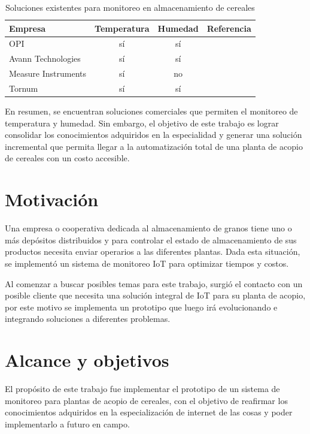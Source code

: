\begin{table}[h]
	\centering
	\caption[]{Soluciones existentes para monitoreo en almacenamiento de cereales}
	\begin{tabular}{l c c c}    
		\toprule
		\textbf{Empresa} 	 & \textbf{Temperatura} 		& \textbf{Humedad} & \textbf{Referencia} \\
		\midrule
		  OPI & sí	& sí  & \citep{WEBSITE:4}\\		
		Avann Technologies	 & sí	& sí & \citep{WEBSITE:3}\\
		Measure Instruments	 & sí	& no & \citep{WEBSITE:1} \\
            Tornum	 & sí	& sí  & \citep{WEBSITE:2}\\
		\bottomrule
		\hline
	\end{tabular}
	\label{tab:peces}
\end{table}

En resumen, se encuentran soluciones comerciales que permiten el monitoreo de temperatura y humedad. Sin embargo, el objetivo de este trabajo es lograr consolidar los conocimientos adquiridos en la especialidad y generar una solución incremental que permita llegar a la automatización total de una planta de acopio de cereales con un costo accesible. 

\section{Motivación}
Una empresa o cooperativa dedicada al almacenamiento de granos tiene uno o más depósitos distribuidos y para controlar el estado de almacenamiento de sus productos necesita enviar operarios a las diferentes plantas. Dada esta situación, se implementó un sistema de monitoreo IoT para optimizar tiempos y costos.

Al comenzar a buscar posibles temas para este trabajo, surgió el contacto con un posible cliente que necesita una solución integral de IoT para su planta de acopio, por este motivo se implementa un prototipo que luego irá evolucionando e integrando soluciones a diferentes problemas. 

\section{Alcance y objetivos}

El propósito de este trabajo fue implementar el prototipo de un sistema de monitoreo para plantas de acopio de cereales, con el objetivo de reafirmar los conocimientos adquiridos en la especialización de internet de las cosas y poder implementarlo a futuro en campo. 

